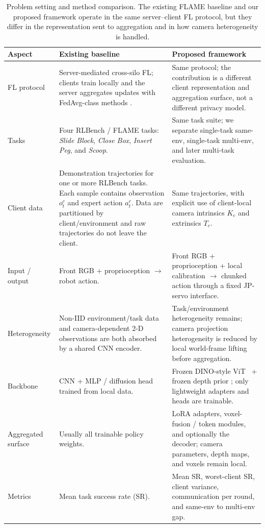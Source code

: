 \documentclass{article}
\begin{document}
\begin{table}[t]
\centering
\small
\caption{Problem setting and method comparison. The existing FLAME
baseline and our proposed framework operate in the same
server--client FL protocol, but they differ in the representation
sent to aggregation and in how camera heterogeneity is handled.}
\label{tab:setting}
\begin{tabular}{p{2.5cm}p{5.1cm}p{5.1cm}}
\toprule
Aspect & Existing baseline & Proposed framework\\
\midrule
FL protocol & Server-mediated cross-silo FL; clients train locally
and the server aggregates updates with FedAvg-class methods
\cite{fedavg}. & Same protocol; the contribution is a different
client representation and aggregation surface, not a different
privacy model.\\
Tasks & Four RLBench / FLAME tasks: \emph{Slide Block},
\emph{Close Box}, \emph{Insert Peg}, and \emph{Scoop}. &
Same task suite; we separate single-task same-env, single-task
multi-env, and later multi-task evaluation.\\
Client data & Demonstration trajectories for one or more RLBench
tasks. Each sample contains observation $o_t^c$ and expert action
$a_t^c$. Data are partitioned by client/environment and raw
trajectories do not leave the client. & Same trajectories, with
explicit use of client-local camera intrinsics $K_c$ and extrinsics
$T_c$.\\
Input / output & Front RGB + proprioception $\rightarrow$ robot
action. & Front RGB + proprioception + local calibration
$\rightarrow$ chunked action through a fixed JP-servo interface.\\
Heterogeneity & Non-IID environment/task data and camera-dependent
2-D observations are both absorbed by a shared CNN encoder. &
Task/environment heterogeneity remains; camera projection
heterogeneity is reduced by local world-frame lifting before
aggregation.\\
Backbone & CNN + MLP / diffusion head trained from local data. &
Frozen DINO-style ViT~\cite{dinov2} + frozen depth prior
\cite{depthanything}; only lightweight adapters and heads are
trainable.\\
Aggregated surface & Usually all trainable policy weights. &
LoRA adapters, voxel-fusion / token modules, and optionally the
decoder; camera parameters, depth maps, and voxels remain local.\\
Metrics & Mean task success rate (SR). & Mean SR, worst-client SR,
client variance, communication per round, and same-env to
multi-env gap.\\
\bottomrule
\end{tabular}
\end{table}
\end{document}
